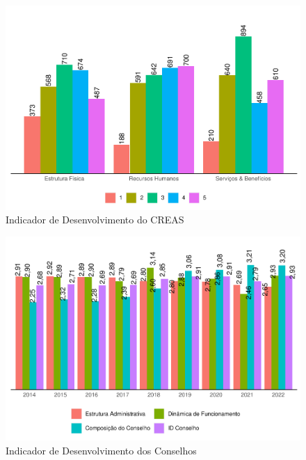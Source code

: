 \documentclass[
  brazilian]{report}
\begin{document}
\begin{figure}
\includegraphics{Censo-SUAS-2022_files/figure-latex/idcreas_est-1} \caption[Indicador de Desenvolvimento do CREAS]{Indicador de Desenvolvimento do CREAS}\label{fig:idcreas_est}
\end{figure}

\begin{figure}
\includegraphics{Censo-SUAS-2022_files/figure-latex/idconselho-1} \caption[Indicador de Desenvolvimento dos Conselhos]{Indicador de Desenvolvimento dos Conselhos}\label{fig:idconselho}
\end{figure}
\end{document}
